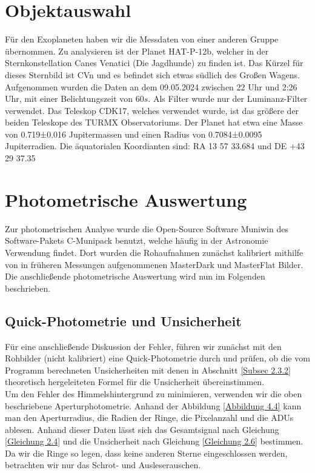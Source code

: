 \documentclass[ngerman,ruledheaders=section,class=report,thesis={type=Protokoll},accentcolor=1b,marginpar=false,parskip=half-,fontsize=11pt,]{tudapub}
\begin{document}
	\section{Objektauswahl}
	Für den Exoplaneten haben wir die Messdaten von einer anderen Gruppe übernommen. Zu analysieren ist der Planet HAT-P-12b, welcher in der Sternkonstellation Canes Venatici (Die Jagdhunde) zu finden ist. Das Kürzel für dieses Sternbild ist CVn und es befindet sich etwas südlich des Großen Wagens. 
	Aufgenommen wurden die Daten an dem 09.05.2024 zwischen 22 Uhr und 2:26 Uhr, mit einer Belichtungszeit von $60\si{s}$. Als Filter wurde nur der Luminanz-Filter verwendet. Das Teleskop CDK17, welches verwendet wurde, ist das größere der beiden Teleskope des TURMX Observatoriums. 
	Der Planet hat etwa eine Masse von 0.719±0.016 Jupitermassen und einen Radius von 0.7084±0.0095 Jupiterradien.
	Die äquatorialen Koordianten sind: RA 13 57 33.684 und DE +43 29 37.35 \cite{exoDataCzech}	\\
	
	
	\section{Photometrische Auswertung}
	
	Zur photometrischen Analyse wurde die Open-Source Software Muniwin des Software-Pakets \glqq C-Munipack \grqq benutzt, welche häufig in der Astronomie Verwendung findet. Dort wurden die Rohaufnahmen zunächst kalibriert mithilfe von in früheren Messungen aufgenommenen MasterDark und MasterFlat Bilder. Die anschließende photometrische Auswertung wird nun im Folgenden beschrieben.
	
	\subsection{Quick-Photometrie und Unsicherheit}
	Für eine anschließende Diskussion der Fehler, führen wir zunächst mit den Rohbilder (nicht kalibriert) eine  Quick-Photometrie durch und prüfen, ob die vom Programm berechneten Unsicherheiten mit denen in Abschnitt \ref{Subsec 2.3.2} theoretisch hergeleiteten Formel für die Unsicherheit übereinstimmen. \\
	Um den Fehler des Himmelshintergrund zu minimieren, verwenden wir die oben beschriebene Aperturphotometrie. Anhand der Abbildung \ref{Abbildung 4.4} kann man den Aperturradius, die Radien der Ringe, die Pixelanzahl und die ADUs ablesen. Anhand dieser Daten lässt sich das Gesamtsignal nach Gleichung \ref{Gleichung 2.4} und die Unsicherheit nach Gleichung \ref{Gleichung 2.6} bestimmen. 
	Da wir die Ringe so legen, dass keine anderen Sterne eingeschlossen werden, betrachten wir nur das Schrot- und Ausleserauschen.
	
\end{document}
